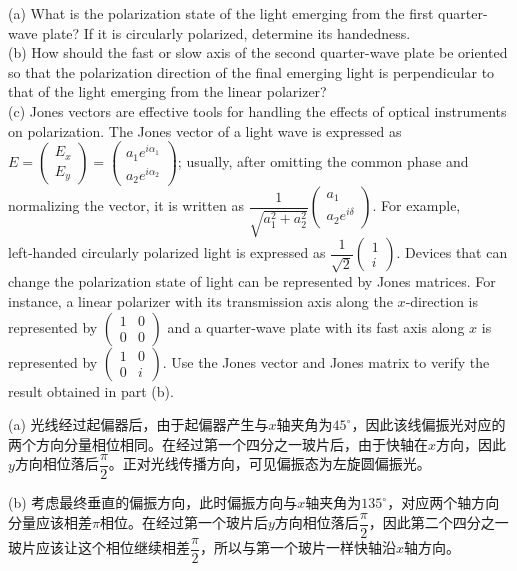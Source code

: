 \begin{solution}[Polarization]
    (a) What is the polarization state of the light emerging from the first quarter-wave plate? If it is circularly polarized, determine its handedness.\\
    (b) How should the fast or slow axis of the second quarter-wave plate be oriented so that the polarization direction of the final emerging light is perpendicular to that of the light emerging from the linear polarizer? \\
    (c) Jones vectors are effective tools for handling the effects of optical instruments on polarization. The Jones vector of a light wave is expressed as $E = \left(\begin{matrix} E_x\\ E_y \end{matrix}\right) = \left(\begin{matrix}a_1 e^{i\alpha_1}\\ a_2 e^{i\alpha_2} \end{matrix}\right)$; usually, after omitting the common phase and normalizing the vector, it is written as $\dfrac{1}{\sqrt{a_1^2 + a_2^2}}\left(\begin{matrix}a_1\\ a_2 e^{i\delta}\end{matrix}\right)$. For example, left‑handed circularly polarized light is expressed as $\dfrac{1}{\sqrt{2}}\left(\begin{matrix}1\\ i\end{matrix}\right)$. Devices that can change the polarization state of light can be represented by Jones matrices. For instance, a linear polarizer with its transmission axis along the $x$‑direction is represented by $\left(\begin{matrix}1 & 0\\ 0 & 0\end{matrix}\right)$ and a quarter‑wave plate with its fast axis along $x$ is represented by $\left(\begin{matrix}1 & 0\\ 0 & i\end{matrix}\right)$. Use the Jones vector and Jones matrix to verify the result obtained in part (b).
    \tcbrule

    (a) 光线经过起偏器后，由于起偏器产生与$x$轴夹角为$45^\circ$，因此该线偏振光对应的两个方向分量相位相同。在经过第一个四分之一玻片后，由于快轴在$x$方向，因此$y$方向相位落后$\dfrac{\pi}{2}$。正对光线传播方向，可见偏振态为左旋圆偏振光。

    (b) 考虑最终垂直的偏振方向，此时偏振方向与$x$轴夹角为$135^\circ$，对应两个轴方向分量应该相差$\pi$相位。在经过第一个玻片后$y$方向相位落后$\dfrac{\pi}{2}$，因此第二个四分之一玻片应该让这个相位继续相差$\dfrac{\pi}{2}$，所以与第一个玻片一样快轴沿$x$轴方向。


\end{solution}
